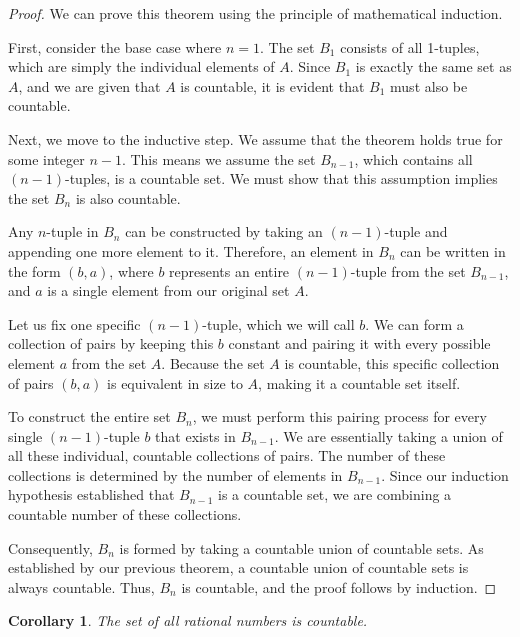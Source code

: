 \documentclass{article}
\theoremstyle{mythm}
\newtheorem{corollary}{Corollary}[theorem]
\begin{document}
\begin{proof}
We can prove this theorem using the principle of mathematical induction. 

First, consider the base case where $n=1$. The set $B_1$ consists of all 1-tuples, which are simply the individual elements of $A$. Since $B_1$ is exactly the same set as $A$, and we are given that $A$ is countable, it is evident that $B_1$ must also be countable.

Next, we move to the inductive step. We assume that the theorem holds true for some integer $n-1$. This means we assume the set $B_{n-1}$, which contains all $(n-1)$-tuples, is a countable set. We must show that this assumption implies the set $B_n$ is also countable.

Any $n$-tuple in $B_n$ can be constructed by taking an $(n-1)$-tuple and appending one more element to it. Therefore, an element in $B_n$ can be written in the form $(b, a)$, where $b$ represents an entire $(n-1)$-tuple from the set $B_{n-1}$, and $a$ is a single element from our original set $A$.

Let us fix one specific $(n-1)$-tuple, which we will call $b$. We can form a collection of pairs by keeping this $b$ constant and pairing it with every possible element $a$ from the set $A$. Because the set $A$ is countable, this specific collection of pairs $(b, a)$ is equivalent in size to $A$, making it a countable set itself.

To construct the entire set $B_n$, we must perform this pairing process for every single $(n-1)$-tuple $b$ that exists in $B_{n-1}$. We are essentially taking a union of all these individual, countable collections of pairs. The number of these collections is determined by the number of elements in $B_{n-1}$. Since our induction hypothesis established that $B_{n-1}$ is a countable set, we are combining a countable number of these collections.

Consequently, $B_n$ is formed by taking a countable union of countable sets. As established by our previous theorem, a countable union of countable sets is always countable. Thus, $B_n$ is countable, and the proof follows by induction.
\end{proof}
\begin{corollary}
The set of all rational numbers is countable.
\end{corollary}
\end{document}
